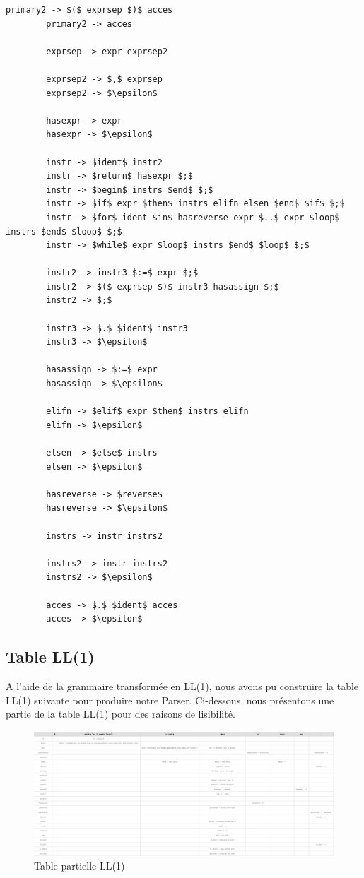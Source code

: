 \documentclass[french,a4paper]{article}
\begin{document}
\begin{lstlisting}[label={lst:lstlisting9}]
        primary2 -> $($ exprsep $)$ acces
        primary2 -> acces

        exprsep -> expr exprsep2

        exprsep2 -> $,$ exprsep
        exprsep2 -> $\epsilon$

        hasexpr -> expr
        hasexpr -> $\epsilon$

        instr -> $ident$ instr2
        instr -> $return$ hasexpr $;$
        instr -> $begin$ instrs $end$ $;$
        instr -> $if$ expr $then$ instrs elifn elsen $end$ $if$ $;$
        instr -> $for$ ident $in$ hasreverse expr $..$ expr $loop$ instrs $end$ $loop$ $;$
        instr -> $while$ expr $loop$ instrs $end$ $loop$ $;$

        instr2 -> instr3 $:=$ expr $;$
        instr2 -> $($ exprsep $)$ instr3 hasassign $;$
        instr2 -> $;$

        instr3 -> $.$ $ident$ instr3
        instr3 -> $\epsilon$

        hasassign -> $:=$ expr
        hasassign -> $\epsilon$

        elifn -> $elif$ expr $then$ instrs elifn
        elifn -> $\epsilon$

        elsen -> $else$ instrs
        elsen -> $\epsilon$

        hasreverse -> $reverse$
        hasreverse -> $\epsilon$

        instrs -> instr instrs2

        instrs2 -> instr instrs2
        instrs2 -> $\epsilon$

        acces -> $.$ $ident$ acces
        acces -> $\epsilon$
    \end{lstlisting}

    \subsection{Table LL(1)}\label{subsec:table-ll(1)}

    A l'aide de la grammaire transformée en LL(1), nous avons pu construire la table LL(1) suivante pour produire notre Parser.
    Ci-dessous, nous présentons une partie de la table LL(1) pour des raisons de lisibilité.

    \begin{figure}[H]
        \centering
        \includegraphics[width=1\textwidth]{partial_table}
        \caption{Table partielle LL(1)}\label{fig:figure2}
    \end{figure}
\end{document}

